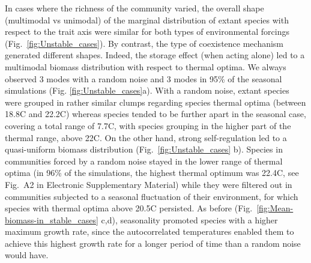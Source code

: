 \documentclass[a4paper,12pt]{article}
\begin{document}
In cases where the richness of the community varied, the overall shape
(multimodal vs unimodal) of the marginal distribution of extant species
with respect to the trait axis were similar for both types of environmental
forcings (Fig.~\ref{fig:Unstable_cases}). By contrast, the type of
coexistence mechanism generated different shapes. Indeed, the storage
effect (when acting alone) led to a multimodal biomass distribution
with respect to thermal optima. We always observed 3 modes with a
random noise and 3 modes in 95\% of the seasonal simulations (Fig.
\ref{fig:Unstable_cases}a). With a random noise, extant species were
grouped in rather similar clumps regarding species thermal optima
(between 18.8\textdegree C and 22.2\textdegree C) whereas species tended to be further apart
in the seasonal case, covering a total range of 7.7\textdegree C, with species
grouping in the higher part of the thermal range, above 22\textdegree C. On the
other hand, strong self-regulation led to a quasi-uniform biomass
distribution (Fig.~\ref{fig:Unstable_cases} b). Species in communities
forced by a random noise stayed in the lower range of thermal optima
(in 96\% of the simulations, the highest thermal optimum was 22.4\textdegree C,
see Fig.~A2 in Electronic Supplementary Material) while they were
filtered out in communities subjected to a seasonal fluctuation of
their environment, for which species with thermal optima above 20.5\textdegree C
persisted. As before (Fig.~\ref{fig:Mean-biomass-in_stable_cases}
c,d), seasonality promoted species with a higher maximum growth rate,
since the autocorrelated temperatures enabled them to achieve this
highest growth rate for a longer period of time than a random noise
would have.
\end{document}
